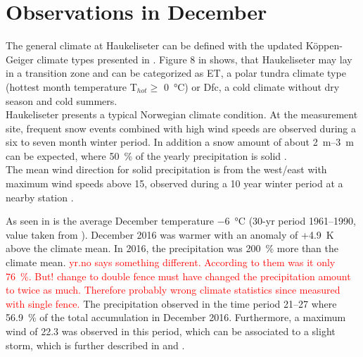 \section{Observations in December}
The general climate at Haukeliseter can be defined with the updated K\"oppen-Geiger climate types presented in \cite{peel_updated_2007}. Figure 8 in \cite{peel_updated_2007} shows, that Haukeliseter may lay in a transition zone and can be categorized as  ET, a polar tundra climate type (hottest month temperature T$_{hot}\ge$ \SI{0}{\celsius}) or Dfc, a cold climate without dry season and cold summers. 
\\
Haukeliseter presents a typical Norwegian climate condition. At the measurement site, frequent snow events combined with high wind speeds are observed during a six to seven month winter period. In addition a snow amount of about \SIrange{2}{3}{\m} can be expected, where \SI{50}{\percent} of the yearly precipitation is solid \citep{wolff_new_2010, wolff_measurements_2013, wolff_derivation_2015}. \\
The mean wind direction for solid precipitation is from the west/east with maximum wind speeds above \SI{15}{\mPs}, observed during a 10 year winter period at a nearby station \citep{wolff_new_2010, wolff_derivation_2015}. 

\noindent As seen in  is the average December temperature \SI{-6}{\celsius} (30-yr period \numrange{1961}{1990}, value taken from \cite{eklima_norwegian_2016}).
December 2016 was warmer with an anomaly of +\SI{4.9}{\kelvin} above the climate mean. 
In 2016, the precipitation was \SI{200}{\percent} more than the climate mean. \textcolor{red}{yr.no says something different. According to them was it only \SI{76}{\percent}. But! change to double fence must have changed the precipitation amount to twice as much. Therefore probably wrong climate statistics since measured with single fence.} 
The precipitation observed in the time period \SIrange{21}{27}{\dec} where \SI{56.9}{\percent} of the total accumulation in December 2016. Furthermore, a maximum wind of \SI{22.3}{\mPs} was observed in this period, which can be associated to a slight storm, which is further described in  and .